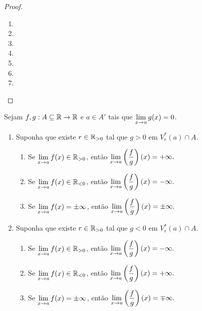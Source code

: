 \begin{proof}
    \leavevmode
        \begin{enumerate}[leftmargin=*, align=left, label=\textbf{(\alph*)}]
            \item \blackproof
            \item \blackproof
            \item \blackproof
            \item \blackproof
            \item \blackproof
            \item \blackproof
            \item \blackproof
        \end{enumerate}
\end{proof}

\begin{proposition}
    Sejam $f,g : A \subseteq \mathbb{R} \to \mathbb{R}$ e $a \in A'$ tais que $\displaystyle \lim_{x \to a} g(x) = 0$.
        \begin{enumerate}[leftmargin=*, align=left, label=\textbf{(\alph*)}]
            \item Suponha que existe $r \in \mathbb{R}_{>0}$ tal que $g > 0$ em $V^*_{r}(a) \cap A$.
                \begin{enumerate}[label=\roman*.]
                    \item Se $\displaystyle \lim_{x \to a} f(x) \in \mathbb{R}_{>0}$, então
                        $ \displaystyle
                            \lim_{x \to a} \left(\dfrac{f}{g} \right)(x) = +\infty.
                        $
                    \item Se $\displaystyle \lim_{x \to a} f(x) \in \mathbb{R}_{<0}$, então
                        $ \displaystyle
                            \lim_{x \to a} \left(\dfrac{f}{g} \right)(x) = -\infty.
                        $
                    \item Se $\displaystyle \lim_{x\to a} f(x)=\pm\infty$, então
                        $\displaystyle
                            \lim_{x\to a}\left(\frac{f}{g}\right)(x)=\pm\infty.
                        $
                \end{enumerate}
            \item Suponha que existe $r \in \mathbb{R}_{>0}$ tal que $g < 0$ em $V^*_{r}(a) \cap A$.
                \begin{enumerate}[label=\roman*.]
                    \item Se $\displaystyle \lim_{x \to a} f(x) \in \mathbb{R}_{>0}$, então
                        $ \displaystyle
                            \lim_{x \to a} \left(\dfrac{f}{g} \right)(x) = -\infty.
                        $
                    \item Se $\displaystyle \lim_{x \to a} f(x) \in \mathbb{R}_{<0}$, então
                        $ \displaystyle
                            \lim_{x \to a} \left(\dfrac{f}{g} \right)(x) = +\infty.
                        $
                    \item Se $\displaystyle \lim_{x\to a} f(x)=\pm\infty$, então
                        $\displaystyle
                            \lim_{x\to a}\left(\frac{f}{g}\right)(x)=\mp\infty.
                        $
                \end{enumerate}
        \end{enumerate}
\end{proposition}

